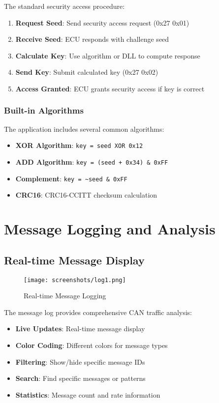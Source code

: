 \documentclass[11pt,a4paper]{article}
\begin{document}
The standard security access procedure:

\begin{enumerate}
    \item \textbf{Request Seed}: Send security access request (0x27 0x01)
    \item \textbf{Receive Seed}: ECU responds with challenge seed
    \item \textbf{Calculate Key}: Use algorithm or DLL to compute response
    \item \textbf{Send Key}: Submit calculated key (0x27 0x02)
    \item \textbf{Access Granted}: ECU grants security access if key is correct
\end{enumerate}

\subsubsection{Built-in Algorithms}

The application includes several common algorithms:

\begin{itemize}
    \item \textbf{XOR Algorithm}: \texttt{key = seed XOR 0x12}
    \item \textbf{ADD Algorithm}: \texttt{key = (seed + 0x34) \& 0xFF}
    \item \textbf{Complement}: \texttt{key = \~{}seed \& 0xFF}
    \item \textbf{CRC16}: CRC16-CCITT checksum calculation
\end{itemize}

\section{Message Logging and Analysis}

\subsection{Real-time Message Display}

\begin{figure}[H]
    \centering
    \texttt{[image: screenshots/log1.png]}
    \caption{Real-time Message Logging}
    \label{fig:log1}
\end{figure}

The message log provides comprehensive CAN traffic analysis:

\begin{itemize}
    \item \textbf{Live Updates}: Real-time message display
    \item \textbf{Color Coding}: Different colors for message types
    \item \textbf{Filtering}: Show/hide specific message IDs
    \item \textbf{Search}: Find specific messages or patterns
    \item \textbf{Statistics}: Message count and rate information
\end{itemize}
\end{document}
